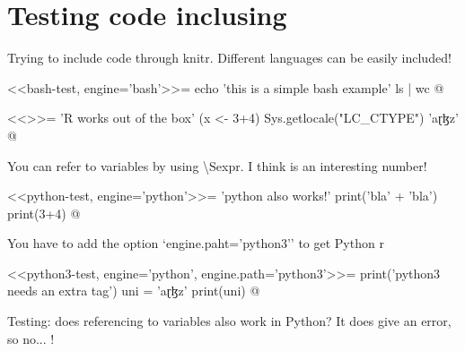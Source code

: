 \chapter{Testing code inclusing}

Trying to include code through knitr. Different languages can be easily 
included!

<<bash-test, engine='bash'>>=
echo 'this is a simple bash example'
ls | wc
@

<<>>=
'R works out of the box'
(x <- 3+4)
Sys.getlocale("LC_CTYPE")
'aɽɮz'
@

You can refer to variables by using \textbackslash Sexpr{}. 
I think  is an interesting number!

<<python-test, engine='python'>>=
'python also works!'
print('bla' + 'bla')
print(3+4)
@

You have to add the option `engine.paht='python3'' to get Python r

<<python3-test, engine='python', engine.path='python3'>>=
print('python3 needs an extra tag')
uni = 'aɽɮz'
print(uni)
@

Testing: does referencing to variables also work in Python? It does give an error, so no... !